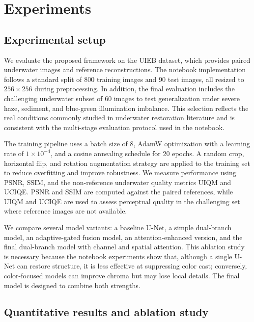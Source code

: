 \section{Experiments} \label{sec:experiments}

\subsection{Experimental setup}

We evaluate the proposed framework on the UIEB dataset, which provides paired underwater images and reference reconstructions. The notebook implementation follows a standard split of 800 training images and 90 test images, all resized to $256 \times 256$ during preprocessing. In addition, the final evaluation includes the challenging underwater subset of 60 images to test generalization under severe haze, sediment, and blue-green illumination imbalance. This selection reflects the real conditions commonly studied in underwater restoration literature and is consistent with the multi-stage evaluation protocol used in the notebook.

The training pipeline uses a batch size of 8, AdamW optimization with a learning rate of $1\times10^{-4}$, and a cosine annealing schedule for 20 epochs. A random crop, horizontal flip, and rotation augmentation strategy are applied to the training set to reduce overfitting and improve robustness. We measure performance using PSNR, SSIM, and the non-reference underwater quality metrics UIQM and UCIQE. PSNR and SSIM are computed against the paired references, while UIQM and UCIQE are used to assess perceptual quality in the challenging set where reference images are not available.

We compare several model variants: a baseline U-Net, a simple dual-branch model, an adaptive-gated fusion model, an attention-enhanced version, and the final dual-branch model with channel and spatial attention. This ablation study is necessary because the notebook experiments show that, although a single U-Net can restore structure, it is less effective at suppressing color cast; conversely, color-focused models can improve chroma but may lose local details. The final model is designed to combine both strengths.

\subsection{Quantitative results and ablation study}

